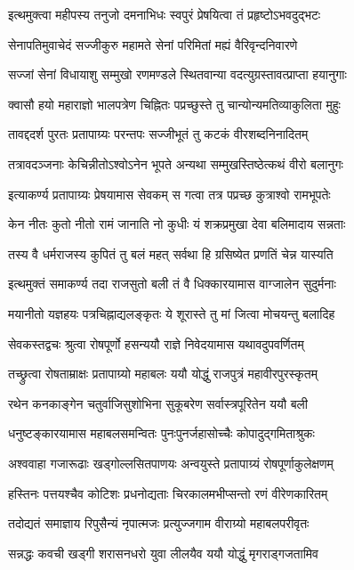 \twolineshloka
{इत्थमुक्त्वा महीपस्य तनुजो दमनाभिधः}
{स्वपुरं प्रेषयित्वा तं प्रहृष्टोऽभवदुद्भटः}%

\twolineshloka
{सेनापतिमुवाचेदं सज्जीकुरु महामते}
{सेनां परिमितां मह्यं वैरिवृन्दनिवारणे}%

\twolineshloka
{सज्जां सेनां विधायाशु सम्मुखो रणमण्डले}
{स्थितवान्या वदत्युग्रस्तावत्प्राप्ता हयानुगाः}%

\twolineshloka
{क्वासौ हयो महाराज्ञो भालपत्रेण चिह्नितः}
{पप्रच्छुस्ते तु चान्योन्यमतिव्याकुलिता मुहुः}%

\twolineshloka
{तावद्ददर्श पुरतः प्रतापाग्र्यः परन्तपः}
{सज्जीभूतं तु कटकं वीरशब्दनिनादितम्}%

\twolineshloka
{तत्रावदञ्जनाः केचिन्नीतोऽश्वोऽनेन भूपते}
{अन्यथा सम्मुखस्तिष्ठेत्कथं वीरो बलानुगः}%

\twolineshloka
{इत्याकर्ण्य प्रतापाग्र्यः प्रेषयामास सेवकम्}
{स गत्वा तत्र पप्रच्छ कुत्राश्वो रामभूपतेः}%

\twolineshloka
{केन नीतः कुतो नीतो रामं जानाति नो कुधीः}
{यं शक्रप्रमुखा देवा बलिमादाय सन्नताः}%

\twolineshloka
{तस्य वै धर्मराजस्य कुपितं तु बलं महत्}
{सर्वथा हि ग्रसिष्येत प्रणतिं चेन्न यास्यति}%

\twolineshloka
{इत्थमुक्तं समाकर्ण्य तदा राजसुतो बली}
{तं वै धिक्कारयामास वाग्जालेन सुदुर्मनाः}%

\twolineshloka
{मयानीतो यज्ञहयः पत्रचिह्नाद्यलङ्कृतः}
{ये शूरास्ते तु मां जित्वा मोचयन्तु बलादिह}%

\twolineshloka
{सेवकस्तद्वचः श्रुत्वा रोषपूर्णो हसन्ययौ}
{राज्ञे निवेदयामास यथावदुपवर्णितम्}%

\twolineshloka
{तच्छ्रुत्वा रोषताम्राक्षः प्रतापाग्र्यो महाबलः}
{ययौ योद्धुं राजपुत्रं महावीरपुरस्कृतम्}%

\twolineshloka
{रथेन कनकाङ्गेन चतुर्वाजिसुशोभिना}
{सुकूबरेण सर्वास्त्रपूरितेन ययौ बली}%

\twolineshloka
{धनुष्टङ्कारयामास महाबलसमन्वितः}
{पुनःपुनर्जहासोच्चैः कोपादुद्गमिताश्रुकः}%

\twolineshloka
{अश्ववाहा गजारूढाः खड्गोल्लसितपाणयः}
{अन्वयुस्ते प्रतापाग्र्यं रोषपूर्णाकुलेक्षणम्}%

\twolineshloka
{हस्तिनः पत्तयश्चैव कोटिशः प्रधनोद्यताः}
{चिरकालमभीप्सन्तो रणं वीरेणकारितम्}%

\twolineshloka
{तदोद्यतं समाज्ञाय रिपुसैन्यं नृपात्मजः}
{प्रत्युज्जगाम वीराग्र्यो महाबलपरीवृतः}%

\twolineshloka
{सन्नद्धः कवची खड्गी शरासनधरो युवा}
{लीलयैव ययौ योद्धुं मृगराड्गजतामिव}%

